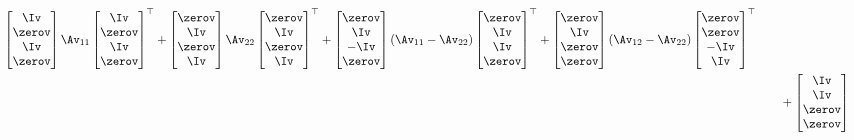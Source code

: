 \documentclass{ctexart}
\begin{document}
\begin{align*}
\begin{bmatrix}
        \Iv \\ \zerov \\ \Iv \\ \zerov
    \end{bmatrix} \Av_{11}
    \begin{bmatrix}
        \Iv \\ \zerov \\ \Iv \\ \zerov
    \end{bmatrix}^\top +
    \begin{bmatrix}
        \zerov \\ \Iv \\ \zerov \\ \Iv
    \end{bmatrix} \Av_{22}
    \begin{bmatrix}
        \zerov \\ \Iv \\ \zerov \\ \Iv
    \end{bmatrix}^\top +
    \begin{bmatrix}
        \zerov \\ \Iv \\ -\Iv \\ \zerov
    \end{bmatrix} (\Av_{11} - \Av_{22})
    \begin{bmatrix}
        \zerov \\ \Iv \\ \Iv \\ \zerov
    \end{bmatrix}^\top +
    \begin{bmatrix}
        \zerov \\ \Iv \\ \zerov \\ \zerov
    \end{bmatrix} (\Av_{12} - \Av_{22})
    \begin{bmatrix}
        \zerov \\ \zerov \\ -\Iv \\ \Iv
    \end{bmatrix}^\top                                                                                                                                                                                                \\
                      & \qquad +
    \begin{bmatrix}
        \Iv \\ \Iv \\ \zerov \\ \zerov

\end{bmatrix}
\end{align*}
\end{document}
